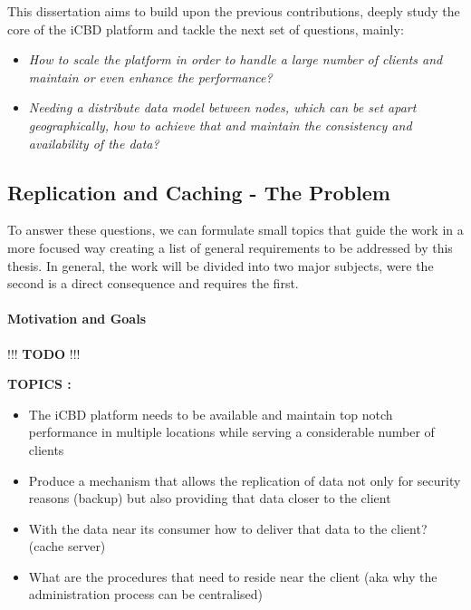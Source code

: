 This dissertation aims to build upon the previous contributions, deeply study the core of the iCBD platform and tackle the next set of questions, mainly:

\begin{itemize}
	\item \textit{How to scale the platform in order to handle a large number of clients and maintain or even enhance the performance?}
	\item \textit{Needing a distribute data model between nodes, which can be set apart geographically, how to achieve that and maintain the consistency and availability of the data?
}\end{itemize}




\subsection{Replication and Caching - The Problem}
\label{sec:replication_cache_theproblem}

To answer these questions, we can formulate small topics that guide the work in a more focused way creating a list of general requirements to be addressed by this thesis.
In general, the work will be divided into two major subjects, were the second is a direct consequence and requires the first.


\paragraph{Motivation and Goals}
\label{par:motivation_goals}

!!! \textbf{TODO} !!!

\textbf{TOPICS :}
\begin{itemize}
	\item The iCBD platform needs to be available and maintain top notch performance in multiple locations while serving a considerable number of clients
	\item Produce a mechanism that allows the replication of data not only for security reasons (backup) but also providing that data closer to the client
	\item With the data near its consumer how to deliver that data to the client? (cache server)
	\item What are the procedures that need to reside near the client (aka why the administration process can be centralised)
\end{itemize}



